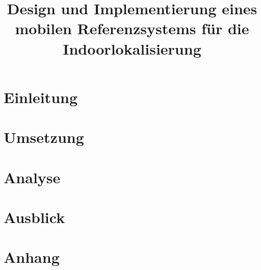 \documentclass[ngerman, paper=a4, 11pt, cleardoubleempty, twoside, openright, BCOR=7mm, DIV12, idxtotoc, liststotoc, bibtotoc, headinclude=false]{scrreprt}
\title{Design und Implementierung eines mobilen Referenzsystems für die Indoorlokalisierung}
\begin{document}
	\maketitle
	\cleardoublepage
	
	\affirmation
	
	\cleardoublepage
	
	\tableofcontents
	\listoffigures
	\listoftables
	\lstlistoflistings
	\printglossaries
	\cleardoublepage
    
	\chapter{Einleitung} 
	\label{cha:einleitung}
	
	
	

	\chapter{Umsetzung} 
	\label{cha:umsetzung}
	
	
	
	

	\chapter{Analyse} 
	\label{cha:analyse}
	
	
	

	\chapter{Ausblick} 
	\label{cha:ausblick}
	

	\chapter{Anhang}
	\label{cha:anhang}
	
	
	
	
\end{document}
